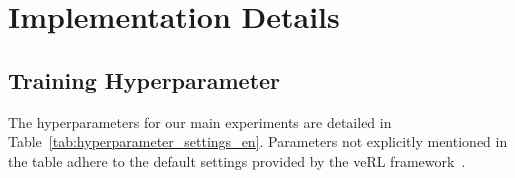 \documentclass[10pt, a4paper, logo]{googledeepmind} %
\begin{document}






\newpage
\appendix
\section{Implementation Details}
\label{app:imp}

\subsection{Training Hyperparameter}
\label{app:training_hyper}
The hyperparameters for our main experiments are detailed in Table~\ref{tab:hyperparameter_settings_en}. Parameters not explicitly mentioned in the table adhere to the default settings provided by the veRL framework~\citep{sheng2024hybridflow}.
\end{document}
